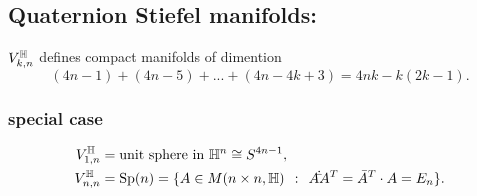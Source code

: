 \documentclass[a4paper,11pt,english]{article}
\begin{document}
\subsection{Quaternion Stiefel manifolds:}
$V^{\mathbb{H}}_{k,n}$ defines compact manifolds of dimention
\[ (4n-1) + (4n-5) + ... + (4n-4k+3) = 4nk - k(2k-1). \]



\subsubsection{special case}
\begin{align*}
V^{\mathbb{H}}_{1,n} &= \text{unit sphere in } \mathbb{H}^n \cong S^{4n-1}, \\
V^{\mathbb{H}}_{n,n} &= \operatorname{Sp}(n) = \{ A \in M(n\times n, \mathbb{H}) \:\::\:\: A\dot \bar{A}^T =
\bar{A}^T\cdot A = E_n \}.
\end{align*}
\end{document}
